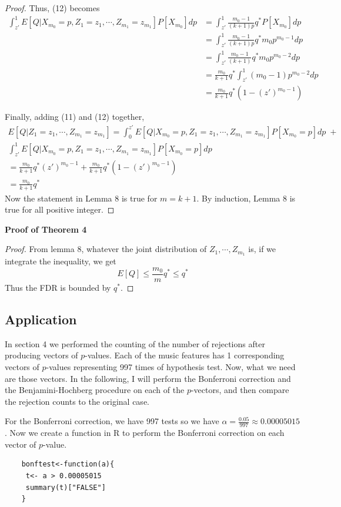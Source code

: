 \documentclass[12pt]{article}
\theoremstyle{plain}
\theoremstyle{definition}
\theoremstyle{remark}
\begin{document}
\begin{proof}
Thus, (12) becomes
\begin{align*}
\int_{z'}^1E[Q|X_{m_0}=p,Z_1=z_1,\cdots,Z_{m_1}=z_{m_1}]P[X_{m_0}]dp 
&= \int_{z'}^1 \frac{m_0-1}{(k+1)p}q^*P[X_{m_0}]dp\\
&=\int_{z'}^1 \frac{m_0-1}{(k+1)p}q^*m_0p^{m_0-1}dp\\
&=\int_{z'}^1 \frac{m_0-1}{(k+1)}q^*m_0p^{m_0-2}dp\\
&=\frac{m_0}{k+1}q^*\int_{z'}^1(m_0-1)p^{m_0-2}dp\\
&=\frac{m_0}{k+1}q^*(1-(z')^{m_0-1})
\end{align*}

Finally, adding (11) and (12) together,
\begin{gather*}
    E[Q|Z_1=z_1,\cdots,Z_{m_1}=z_{m_1}]=\int_0^{z'}E[Q|X_{m_0}=p,Z_1=z_1,\cdots,Z_{m_1}=z_{m_1}]P[X_{m_0}=p]dp\;+\\\int_{z'}^1E[Q|X_{m_0}=p,Z_1=z_1,\cdots,Z_{m_1}=z_{m_1}]P[X_{m_0}=p]dp\\ 
    =\frac{m_0}{k+1}q^*(z')^{m_0-1}+\frac{m_0}{k+1}q^*(1-(z')^{m_0-1})\\
    =\frac{m_0}{k+1}q^*
\end{gather*}
Now the statement in Lemma 8 is true for $m=k+1$. By induction, Lemma 8 is true for all positive integer.
\end{proof}


\textbf{Proof of Theorem 4}
\begin{proof} \cite{5.3}\cite{5.7}
From lemma 8, whatever the joint distribution of $Z_1,\cdots,Z_{m_1}$ is,  if we integrate the inequality, we get
\[E[Q]\leq\frac{m_0}{m}q^*\leq q^*
\]
Thus the FDR is bounded by $q^*$.
\end{proof}

\newpage
\subsection{Application}
In section 4 we performed the counting of the number of rejections after producing vectors of $p$-values. Each of the music features has 1 corresponding vectors of $p$-values representing 997 times of hypothesis test. Now, what we need are those vectors. In the following, I will perform the Bonferroni correction and the Benjamini-Hochberg procedure on each of the $p$-vectors, and then compare the rejection counts to the original case.

For the Bonferroni correction, we have 997 tests so we have $\alpha=\frac{0.05}{997}\approx 0.00005015$. Now we create a function in R to perform the Bonferroni correction on each vector of $p$-value.
\begin{verbatim}
    bonftest<-function(a){
     t<- a > 0.00005015
     summary(t)["FALSE"]
    }
\end{verbatim}
\end{document}
